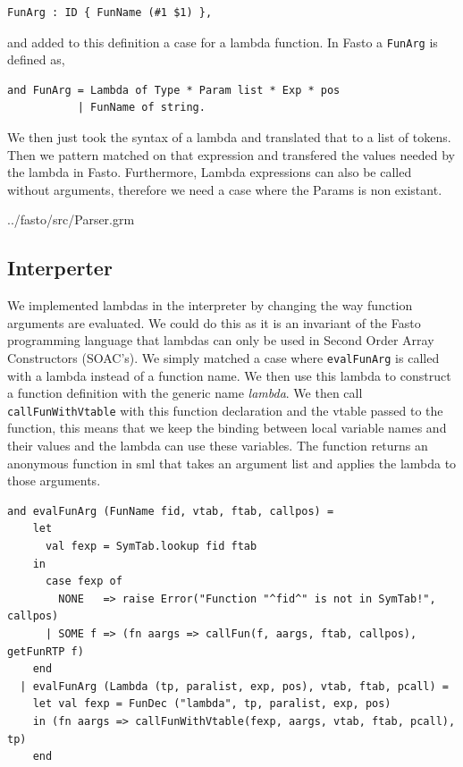 \documentclass[11pt]{article}
\begin{document}
    \begin{lstlisting}[basicstyle=\small]
FunArg : ID { FunName (#1 $1) },
    \end{lstlisting}

    and added to this definition a case for a lambda function.  In Fasto a
    \texttt{FunArg} is defined as,

    \begin{lstlisting}[basicstyle=\small]
and FunArg = Lambda of Type * Param list * Exp * pos
           | FunName of string.
    \end{lstlisting}

    We then just took the syntax of a lambda and translated that to a list of
    tokens.  Then we pattern matched on that expression and transfered the
    values needed by the lambda in Fasto. Furthermore, Lambda expressions can also
    be called without arguments, therefore we need a case where the Params is non
    existant.


{../fasto/src/Parser.grm}

\subsection{Interperter}
    We implemented lambdas in the interpreter by changing the way function
    arguments are evaluated.  We could do this as it is an invariant of the
    Fasto programming language that lambdas can only be used in Second Order
    Array Constructors (SOAC's).  We simply matched a case where
    \texttt{evalFunArg} is called with a lambda instead of a function name.  We
    then use this lambda to construct a function definition with the generic
    name \textit{lambda}.  We then call \texttt{callFunWithVtable} with this
    function declaration and the vtable passed to the function, this means that
    we keep the binding between local variable names and their values and the
    lambda can use these variables.  The function returns an anonymous function
    in sml that takes an argument list and applies the lambda to those
    arguments.

    \begin{lstlisting}[basicstyle=\small]
and evalFunArg (FunName fid, vtab, ftab, callpos) =
    let
      val fexp = SymTab.lookup fid ftab
    in
      case fexp of
        NONE   => raise Error("Function "^fid^" is not in SymTab!", callpos)
      | SOME f => (fn aargs => callFun(f, aargs, ftab, callpos), getFunRTP f)
    end
  | evalFunArg (Lambda (tp, paralist, exp, pos), vtab, ftab, pcall) =
    let val fexp = FunDec ("lambda", tp, paralist, exp, pos)
    in (fn aargs => callFunWithVtable(fexp, aargs, vtab, ftab, pcall), tp)
    end
    \end{lstlisting}
\end{document}
